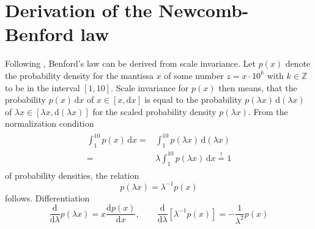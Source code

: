 \documentclass[a4paper,10pt, twocolumn]{article}
\begin{document}
\section{Derivation of the Newcomb-Benford law}
Following \cite{Burgos2021}, Benford's law can be derived from scale invariance. Let $p(x)$ denote the probability density for the mantissa $x$ of some number $z = x\cdot 10^k$ with $k \in \mathbb{Z}$ to be in the interval $[1,10]$. Scale invariance for $p(x)$ then means, that the probability $p(x)\,\mathrm{d}x$ of $x \in [x, \mathrm{d}x]$ is equal to the probability $p(\lambda x)\,\mathrm{d}(\lambda x)$ of $\lambda x \in [\lambda x, \mathrm{d}(\lambda x)]$ for the scaled probability density $p(\lambda x)$. From the normalization condition \begin{align}\begin{aligned}\label{eq:normalizationcondition}
	\int_{1}^{10} p(x)\,\mathrm{d}x =& \int_{1}^{10} p(\lambda x)\,\mathrm{d}(\lambda x) \\ =& \lambda \int_{1}^{10} p(\lambda x)\,\mathrm{d}x \overset{!}{=} 1
	\end{aligned}\end{align}
of probability densities, the relation \begin{equation}
	p(\lambda x) = \lambda^{-1}p(x)
\end{equation} follows. Differentiation \begin{equation}
\frac{\mathrm{d}}{\mathrm{d}\lambda} p(\lambda x) = x\frac{\mathrm{d}p(x)}{\mathrm{d}x}, \qquad \frac{\mathrm{d}}{\mathrm{d}\lambda}[\lambda^{-1}p(x)] = -\frac{1}{\lambda^2}p(x)
\end{equation}
\end{document}
